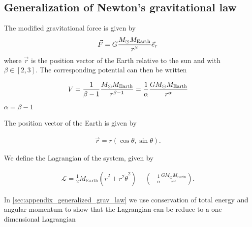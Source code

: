 \documentclass[../main.tex]{subfiles}
\begin{document}

\subsection{Generalization of Newton's gravitational law}
The modified gravitational force is given by 
\begin{align}
    \vec{F}=G\frac{M_{\odot} M_{\textnormal{\text{Earth}}}}{r^{\beta}}\vec{e}_r
\end{align} where \ensuremath{\vec{r}} is the position vector of the Earth relative to the sun and with \ensuremath{\beta \in [2,3]}. The corresponding potential can then be written

\begin{align}
    V = \frac{1}{\beta-1}\frac{M_{\odot} M_{\textnormal{\text{Earth}}}}{r^{\beta-1}}=\frac{1}{\alpha}\frac{GM_{\odot} M_{\text{Earth}}}{r^{\alpha}}
\end{align} \ensuremath{\alpha = \beta - 1}

The position vector of the Earth is given by

\begin{align*}
    \vec{r}=r(\cos\theta,\sin\theta).
\end{align*}

We define the Lagrangian of the system, given by

\begin{align*}
    \mathcal{L}=\frac{1}{2}M_{\text{Earth}}(\dot{r}^2+r^2\dot{\theta}^2)-\left(-\frac{1}{\alpha}\frac{GM_{\odot} M_{\text{Earth}}}{r^{\alpha}}\right).
\end{align*}

In \cref{sec:appendix_generalized_grav_law} we use conservation of total energy and angular momentum to show that the Lagrangian can be reduce to a one dimensional Lagrangian
\end{document}
